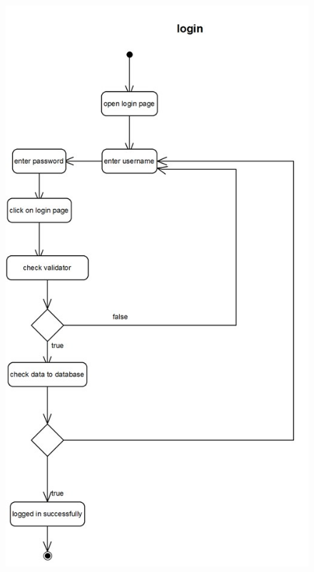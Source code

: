 \documentclass[]{article}
\begin{document}
\begin{figure}[H]
\centering
\includegraphics[scale=0.6]{./activity/03}
\end{figure}
\end{document}
